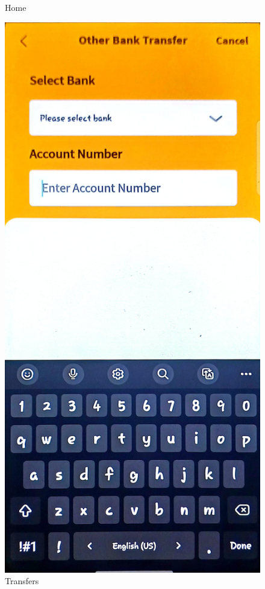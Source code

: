 \documentclass[a4paper,12pt]{report}
\begin{document}
\begin{figure}[h]
\begin{minipage}[b]{0.3\textwidth}
    \caption{Home}
  \end{minipage}
  \hfill
  \begin{minipage}[b]{0.3\textwidth}
    \includegraphics[width=\linewidth]{../images/screenshots/bank-of-abyssinia/boa_transfer.jpg}
    \caption{Transfers}
  \end{minipage}
\end{figure}
\end{document}
